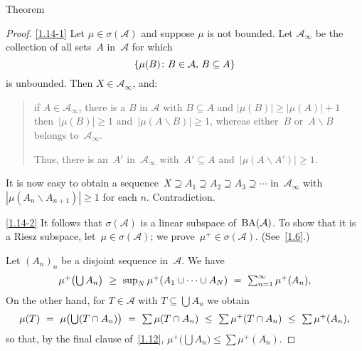 \documentclass[main.tex]{subfiles}
\begin{document}
%
%
\begin{psec}{1.14}{Theorem}
\end{psec}
\begin{proof}
\ref{1.14-1} Let $\mu\in\sigma(\mathcal A)$
and suppose $\mu$ is not bounded.
Let $\mathcal{A}_\infty$ be
the collection of all sets~$A$ in~$\mathcal A$ for which
\begin{equation*}
\{ \mu(B)\colon B\in \mathcal A\text{, }B\subseteq A \}
\end{equation*} 
is unbounded.  
Then $X\in\mathcal{A}_\infty$, and:

\begin{quote}
if $A\in \mathcal{A}_\infty$,
there is a $B$ in $\mathcal A$ with $B\subseteq A$
and $|\mu(B)|\geq |\mu(A)|+1$
then~$|\mu(B)|\geq 1$
and~$|\mu(A\backslash B)|\ge 1$,
whereas either~$B$ or~$A\backslash B$
belongs to~$\mathcal{A}_\infty$.

Thus, there is an~$A'$ in~$\mathcal{A}_\infty$ with~$A'\subseteq A$
and~$|\mu(A\backslash A')|\ge 1$.
\end{quote}

It is now easy to obtain a 
sequence~$X\supseteq A_1\supseteq A_2\supseteq A_3 \supseteq \dotsb$
in~$\mathcal{A}_\infty$ 
with~$|\mu(A_n\backslash A_{n+1})|\geq 1$ for each $n$.
Contradiction.

\ref{1.14-2} 
It follows that $\sigma(\mathcal{A})$ 
is a linear subspace of~$\mathrm{BA}(\mathcal A)$.
To show that it is a Riesz subspace,
let~$\mu\in\sigma(\mathcal A)$;
we prove~$\mu^+\in\sigma(\mathcal A)$. (See~\ref{1.6}.)

Let $(A_n)_n$ be a disjoint sequence in~$\mathcal A$.
We have
\begin{equation*}
\textstyle
\mu^+ \bigl( \bigcup A_n \bigr)
   \ \geq\  \sup_N  \mu^+(A_1 \cup \dotsb \cup A_N) 
   \ =\  \sum_{n=1}^\infty \mu^+(A_n)
\text{,}
\end{equation*}
On the other hand,
for $T\in\mathcal A$ with $T\subseteq\bigcup A_n$ we obtain
\begin{equation*}
\textstyle
\mu(T)\ =\ \mu\bigl(\bigcup(T\cap A_n)\bigr)
\ =\ \sum\mu(T\cap A_n)
\ \leq\ \sum\mu^+(T\cap A_n)
\ \leq\ \sum\mu^+(A_n)\text{,}
\end{equation*}
so that, 
by the final clause of~\ref{1.12},
$\mu^+\bigl(\bigcup A_n\bigr) \leq \sum\mu^+(A_n)$.
\xqed
\end{proof}
\clearpage
\emptypage
\end{document}
